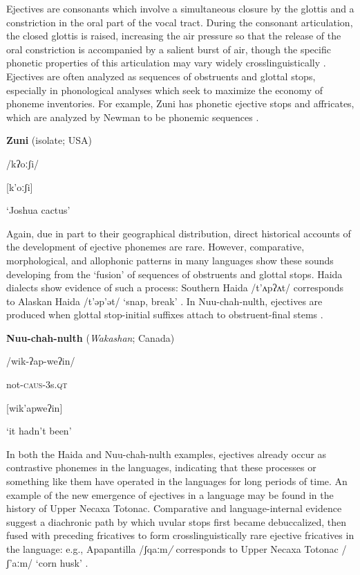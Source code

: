   Ejectives are consonants which involve a simultaneous closure by the glottis and a constriction in the oral part of the vocal tract. During the consonant articulation, the closed glottis is raised, increasing the air pressure so that the release of the oral constriction is accompanied by a salient burst of air, though the specific phonetic properties of this articulation may vary widely crosslinguistically \citep{Lindau1984}. Ejectives are often analyzed as sequences of obstruents and glottal stops, especially in phonological analyses which seek to maximize the economy of phoneme inventories. For example, Zuni has phonetic ejective stops and affricates, which are analyzed by Newman to be phonemic sequences .

\ea\label{ex:(4.42)}
  \textbf{Zuni} (isolate; USA)

/kʔoːʃi/

[k’oːʃi]

\glt ‘Joshua cactus’

\citep[16]{Newman1965}

\z

  Again, due in part to their geographical distribution, direct historical accounts of the development of ejective phonemes are rare. However, comparative, morphological, and allophonic patterns in many languages show these sounds developing from the ‘fusion’ of sequences of obstruents and glottal stops. Haida dialects show evidence of such a process: Southern Haida /t’ʌpʔʌt/ corresponds to Alaskan Haida /t’əp’ət/ ‘snap, break’ \citep[312]{Fallon2002}. In Nuu-chah-nulth, ejectives are produced when glottal stop-initial suffixes attach to obstruent-final stems .

\ea\label{ex:(4.43)}
  \textbf{Nuu-chah-nulth} (\textit{Wakashan}; Canada)

/wik-ʔap-weʔin/

not-\textsc{caus}-3s.\textsc{qt}

[wik’apweʔin]

\glt ‘it hadn’t been’

\citep[69]{Stonham1999}
\z

  In both the Haida and Nuu-chah-nulth examples, ejectives already occur as contrastive phonemes in the languages, indicating that these processes or something like them have operated in the languages for long periods of time. An example of the new emergence of ejectives in a language may be found in the history of Upper Necaxa Totonac. Comparative and language-internal evidence suggest a diachronic path by which uvular stops first became debuccalized, then fused with preceding fricatives to form crosslinguistically rare ejective fricatives in the language: e.g., Apapantilla /ʃqaːm\textit{/} corresponds to Upper Necaxa Totonac /ʃ’aːm/ ‘corn husk’ \citep[6]{Beck2006}.

